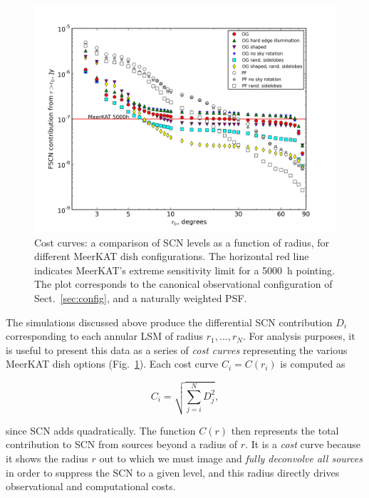 \documentclass{aa}
\begin{document}
\begin{figure}
\includegraphics[width=\columnwidth]{costcurve-main}
\caption{\label{fig:cc-main}Cost curves: a comparison of SCN levels as a function of radius, for different MeerKAT dish configurations. The horizontal red line indicates MeerKAT's extreme sensitivity limit for a 5000~h pointing. The plot corresponds to the canonical observational configuration of Sect.~\ref{sec:config}, and a naturally weighted PSF.}
\end{figure}

The simulations discussed above produce the differential SCN contribution $D_i$ corresponding to each annular LSM of radius $r_1,...,r_N$. For analysis purposes, it is useful to present this data as a series of {\em cost curves} representing the various MeerKAT dish options (Fig.~\ref{fig:cc-main}). Each cost curve $C_i=C(r_i)$ is computed as

\[
  C_i = \sqrt{\sum_{j=i}^{N} D^2_j},
\]

since SCN adds quadratically. The function $C(r)$ then represents the total contribution to SCN from sources beyond a radius of $r$. It is a \emph{cost} curve because it shows the radius $r$ out to which we must image and {\em fully deconvolve all sources} in order to suppress the SCN to a given level, and this radius directly drives observational and computational costs. 
\end{document}
